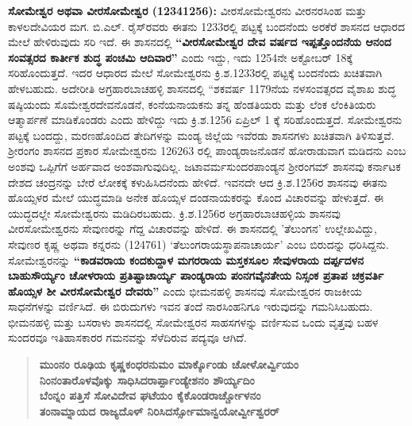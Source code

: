 \textbf{ಸೋಮೇಶ್ವರ ಅಥವಾ ವೀರಸೋಮೇಶ್ವರ (12341256):} ವೀರಸೋಮೇಶ್ವರನು ವೀರನರಸಿಂಹ ಮತ್ತು ಕಾಳಲದೇವಿಯರ ಮಗ. ಬಿ.ಎಲ್​. ರೈಸ್​ರವರು ಈತನು 1233ರಲ್ಲಿ ಪಟ್ಟಕ್ಕೆ ಬಂದನೆಂದು ಅರಕೆರೆ ಶಾಸನದ ಆಧಾರದ ಮೇಲೆ ಹೇಳಿರುವುದು ಸರಿ ಇದೆ. ಈ ಶಾಸನದಲ್ಲಿ \textbf{“ವೀರಸೋಮೇಶ್ವರ ದೇವ ವರ್ಷದ ಇಪ್ಪತ್ತೊಂದನೆಯ ಆನಂದ ಸಂವತ್ಸರದ ಕಾರ್ತೀಕ ಶುದ್ಧ ಪಂಚಮಿ ಆದಿವಾರ”} ಎಂದು ಇದ್ದು, ಇದು 1254ನೇ ಅಕ್ಟೋಬರ್​ 18ಕ್ಕೆ ಸರಿಹೊಂದುತ್ತದೆ. ಇದರ ಆಧಾರದ ಮೇಲೆ ಸೋಮೇಶ್ವರನು ಕ್ರಿ.ಶ.1233ರಲ್ಲಿ ಪಟ್ಟಕ್ಕೆ ಬಂದನೆಂದು ಖಚಿತವಾಗಿ ಹೇಳಬಹುದು. ಅದೇರೀತಿ ಅಗ್ರಹಾರಬಾಚಹಳ್ಳಿ ಶಾಸನದಲ್ಲಿ “ಶಕವರ್ಷ 1179ನೆಯ ನಳಸಂವತ್ಸರದ ವೈಶಾಖ ಶುದ್ಧ ಷಷ್ಠಿಯಂದು ಸೊಮೇಶ್ವರದೇವನೊಡನೆ, ಕಂನೆಯನಾಯಕನು ತನ್ನ ಹೆಂಡತಿಯರು ಮತ್ತು ಲೆಂಕ ಲೆಂಕಿತಿಯರು ಆತ್ಮಾರ್ಪಣೆ ಮಾಡಿಕೊಂಡರು ಎಂದು ಹೇಳಿದ್ದು ಇದು ಕ್ರಿ.ಶ.1256 ಏಪ್ರಿಲ್​ 1 ಕ್ಕೆ ಸರಿಹೊಂದುತ್ತದೆ. ಸೋಮೇಶ್ವರನು ಪಟ್ಟಕ್ಕೆ ಬಂದದ್ದು, ಮರಣಹೊಂದಿದ ತೇದಿಗಳನ್ನು ಮಂಡ್ಯ ಜಿಲ್ಲೆಯ ಇವೆರಡು ಶಾಸನಗಳು ಖಚಿತವಾಗಿ ತಿಳಿಸುತ್ತವೆ. ಶ‍್ರೀರಂಗಂ ಶಾಸನದ ಪ್ರಕಾರ ಸೋಮೇಶ್ವರನು 126263 ರಲ್ಲಿ ಪಾಂಡ್ಯರಾಜನೊಡನೆ ಹೋರಾಡುವಾಗ ಮಡಿದನು ಎಂಬ ಅಂಶವು ಒಪ್ಪಿಗೆಗೆ ಅರ್ಹವಾದ ಅಂಶವಾಗುವುದಿಲ್ಲ. ಜಟಾವರ್ಮಸುಂದರಪಾಂಡ್ಯನ ಶ‍್ರೀರಂಗಮ್ ಶಾಸನವು ಕರ್ನಾಟಕ ದೇಶದ ಚಂದ್ರನನ್ನು ಬೇರೆ ಲೋಕಕ್ಕೆ ಕಳುಹಿಸಿದನೆಂದು ಹೇಳಿದೆ. ಇವನದೇ ಆದ ಕ್ರಿ.ಶ.1256ರ ಶಾಸನವು ಈತನು ಹೊಯ್ಸಳರ ಮೇಲೆ ಯುದ್ಧಮಾಡಿ ಅನೇಕ ಹೊಯ್ಸಳ ದಂಡನಾಯಕರನ್ನು ಕೊಂದ ವಿಚಾರವನ್ನು ಹೇಳುತ್ತದೆ. ಈ ಯುದ್ಧದಲ್ಲೇ ಸೋಮೇಶ್ವರನು ಮಡಿದಿರಬಹುದು. ಕ್ರಿ.ಶ.1256ರ ಅಗ್ರಹಾರಬಾಚಹಳ್ಳಿಯ ಶಾಸನವು ವೀರಸೋಮೇಶ್ವರನು ಸೇವುಣರನ್ನು ಗೆದ್ದ ವಿಚಾರವನ್ನು ಹೇಳಿದೆ. ಈ ಶಾಸನದಲ್ಲಿ 'ತೆಲುಂಗನ' ಉಲ್ಲೇಖವಿದ್ದು, ಸೇವುಣರ ಕೃಷ್ಣ ಅಥವಾ ಕನ್ನರನು (124761) `ತೆಲುಂಗರಾಯಸ್ಥಾಪನಾಚಾರ್ಯ' ಎಂಬ ಬಿರುದನ್ನು ಧರಿಸಿದ್ದನು. ಸೋಮೇಶ್ವರನನ್ನು \textbf{“ಕಾಡವರಾಯ ಕಂದಕುದ್ದಾಳ ಮಗರರಾಯ ಮಸ್ತಕಸೂಲ ಸೇವುಳರಾಯ ದರ್ಪ್ಪದಳನ ಬಾಹುಸೌರ್ಯ್ಯಂ ಚೋಳರಾಯ ಪ್ರತಿಷ್ಟಾಚಾರ್ಯ್ಯ ಪಾಂಡ್ಯರಾಯ ಪಂನಗವೈನತೇಯ ನಿಸ್ಸಂಕ ಪ್ರತಾಪ ಚಕ್ರವರ್ತಿ ಹೊಯ್ಸಳ ಶೀ ವೀರಸೋಮೇಶ್ವರ ದೇವರು”} ಎಂದು ಭೀಮನಹಳ್ಳಿ ಶಾಸನವು ಸೋಮೇಶ್ವರನ ರಾಜಕೀಯ ಸಾಧನೆಗಳನ್ನು ವರ್ಣಿಸಿದೆ. ಈ ಬಿರುದುಗಳು ಇವನ ತಂದೆ ನಾರಸಿಂಹನಿಗೂ ಇರುವುದನ್ನು ಗಮನಿಸಿಬಹುದು. ಭೀಮನಹಳ್ಳಿ ಮತ್ತು ಬಸರಾಳು ಶಾಸನದಲ್ಲಿ ಸೋಮೇಶ್ವರನ ಸಾಹಸಗಳನ್ನು ವರ್ಣಿಸುವ ಒಂದು ವೃತ್ತವು ಬಹಳ ಸುಂದರವೂ ಇತಿಹಾಸಕಾರರ ಗಮನವನ್ನು ಸೆಳೆದಿರುವ ಪದ್ಯವೂ ಆಗಿದೆ.

\begin{verse}
\textbf{ಮುಂನಂ ರೂಢಿಯ ಕೃಷ್ಣಕಂಧರನುಮಂ ಮಾರ್ಕ್ಕೊಂಡು ಚೋಳೋರ್ವ್ವಿಯಂ} \\\textbf{ನಿಂನಂತಾರೊಳವೊಕ್ಕು ಸಾಧಿಸಿದರಾರ್ಪ್ಪಾಂಡ್ಯೇಶನಂ ಶೌರ್ಯ್ಯದಿಂ} \\\textbf{ಬೆಂನ್ನಂ ಪತ್ತಿಸೆ ಸೋವಿದೇವ ಘಟೆಯಂ ಕೈಕೊಂಡರಾರ್ಚ್ಚೋಳನಂ} \\\textbf{ತಂನಾಮ್ನಾಯದ ರಾಜ್ಯದೊಳ್​ ನಿರಿಸಿದರ್ಸ್ಸೋಮಾನ್ವಯೋರ್ವ್ವೀಶ್ವರರ್​}
\end{verse}

